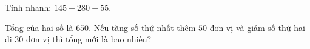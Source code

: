 \begin{ex} %
Tính nhanh: $145 + 280 + 55$.
\end{ex}

\begin{ex} %
Tổng của hai số là $650$. Nếu tăng số thứ nhất thêm $50$ đơn vị và giảm số thứ hai đi $30$ đơn vị thì tổng mới là bao nhiêu?
\end{ex}
